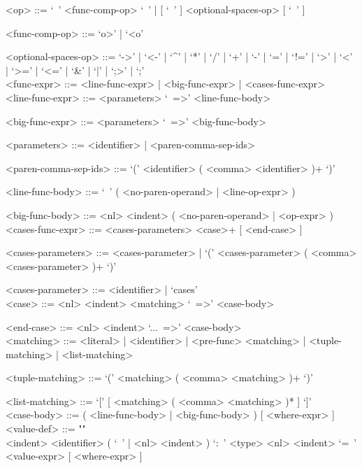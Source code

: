 \documentclass{article}
\begin{document}
\begin{grammar}
<op> ::= `\ ' <func-comp-op> `\ ' | [ `\ ' ] <optional-spaces-op> [ `\ ' ]

<func-comp-op> ::= `o>' | `<o'

<optional-spaces-op> ::= 
`->' | `<-' | `^' | `*' | `/' | `+' | `-' | `=' | `!=' | `>' | `<' | `>=' | `<=' |
`\&' | `|' | `;>' | `;'
\\

<func-expr> ::= <line-func-expr> | <big-func-expr> | <cases-func-expr>
\\

<line-func-expr> ::= <parameters> `\ =>' <line-func-body>

<big-func-expr> ::= <parameters> `\ =>' <big-func-body>

<parameters> ::= <identifier> | <paren-comma-sep-ids>

<paren-comma-sep-ids> ::= `(' <identifier> ( <comma> <identifier> )+ `)'

<line-func-body> ::= `\ ' ( <no-paren-operand> | <line-op-expr> )

<big-func-body> ::= <nl> <indent> ( <no-paren-operand> | <op-expr> )
\\

<cases-func-expr> ::= <cases-parameters> <case>+ [ <end-case> ]

<cases-parameters> ::=
<cases-parameter> | `(' <cases-parameter> ( <comma> <cases-parameter> )+ `)'

<cases-parameter> ::= <identifier> | `cases'
\\

<case> ::=  <nl> <indent> <matching> `\ =>' <case-body>

<end-case> ::= <nl> <indent> `...\ =>' <case-body>
\\

<matching> ::= 
<literal> | <identifier> | <pre-func> <matching> | <tuple-matching> |
<list-matching>

<tuple-matching> ::= `(' <matching> ( <comma> <matching> )+ `)'

<list-matching> ::= `[' [ <matching> ( <comma> <matching> )* ] `]'
\\

<case-body> ::= ( <line-func-body> | <big-func-body> ) [ <where-expr> ]
\\

<value-def> ::= ""\\
<indent> <identifier> 
( `\ ' | <nl> <indent> ) `:\ ' <type> 
<nl> <indent> `=\ ' <value-expr> [ <where-expr> ]


\end{grammar}
\end{document}
